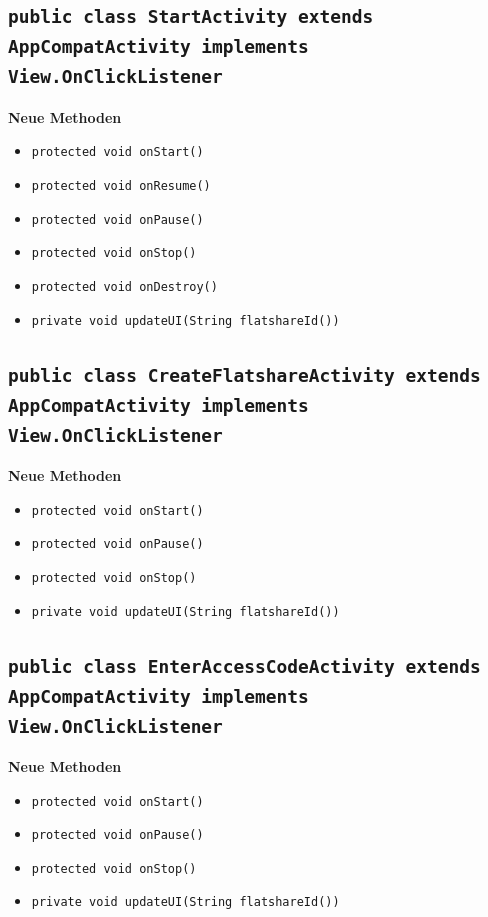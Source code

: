 \documentclass[a4paper]{scrreprt}
\begin{document}
		\subsection{\texttt{public class StartActivity extends AppCompatActivity implements View.OnClickListener}}
			\textbf{Neue Methoden}
			\begin{itemize}
				\item \texttt{protected void onStart()}
				\item \texttt{protected void onResume()}
				\item \texttt{protected void onPause()}
				\item \texttt{protected void onStop()}
				\item \texttt{protected void onDestroy()}
				\item \texttt{private void updateUI(String flatshareId())}
			\end{itemize}
		\subsection{\texttt{public class CreateFlatshareActivity extends AppCompatActivity implements View.OnClickListener}}
			\textbf{Neue Methoden}
			\begin{itemize}
				\item \texttt{protected void onStart()}
				\item \texttt{protected void onPause()}
				\item \texttt{protected void onStop()}
				\item \texttt{private void updateUI(String flatshareId())}
			\end{itemize}
		\subsection{\texttt{public class EnterAccessCodeActivity extends AppCompatActivity implements View.OnClickListener}}
			\textbf{Neue Methoden}
			\begin{itemize}
				\item \texttt{protected void onStart()}
				\item \texttt{protected void onPause()}
				\item \texttt{protected void onStop()}
				\item \texttt{private void updateUI(String flatshareId())}
			\end{itemize}
\end{document}
